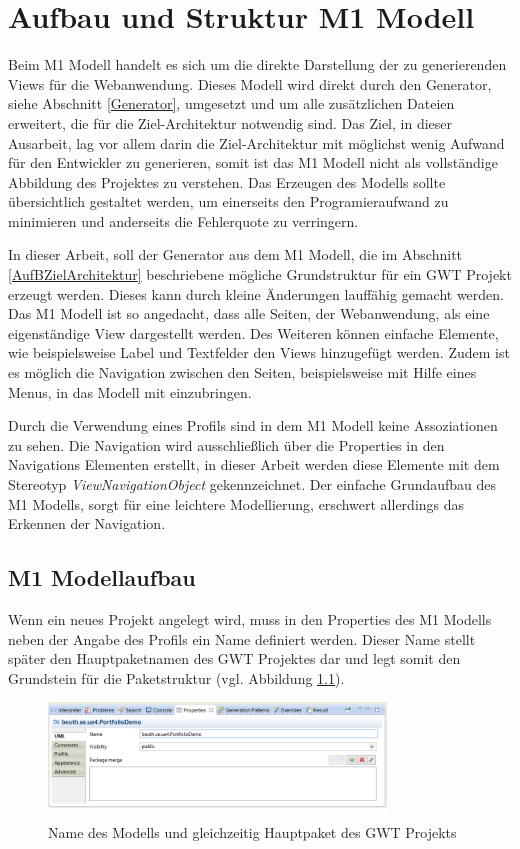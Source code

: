 \chapter{Aufbau und Struktur M1 Modell} \label{M1Modell}
Beim M1 Modell handelt es sich um die direkte Darstellung der zu generierenden
Views für die Webanwendung. Dieses Modell wird direkt durch den Generator,
siehe Abschnitt \ref{Generator}, umgesetzt und um alle zusätzlichen Dateien
erweitert, die für die Ziel-Architektur notwendig sind. Das Ziel, in dieser
Ausarbeit, lag vor allem darin die Ziel-Architektur mit möglichst wenig Aufwand
für den Entwickler zu generieren, somit ist das M1 Modell nicht als vollständige
Abbildung des Projektes zu verstehen. Das Erzeugen des Modells sollte
übersichtlich gestaltet werden, um einerseits den Programieraufwand zu
minimieren und anderseits die Fehlerquote zu verringern.

In dieser Arbeit, soll der Generator aus dem M1 Modell, die im Abschnitt
\ref{AufBZielArchitektur} beschriebene mögliche Grundstruktur für ein GWT
Projekt erzeugt werden. Dieses kann durch kleine Änderungen lauffähig gemacht
werden. Das M1 Modell ist so angedacht, dass alle Seiten, der Webanwendung, als
eine eigenständige View dargestellt werden. Des Weiteren können
einfache Elemente, wie beispielsweise Label und Textfelder den Views hinzugefügt
werden. Zudem ist es möglich die Navigation zwischen den Seiten, beispielsweise
mit Hilfe eines Menus, in das Modell mit einzubringen. 

Durch die Verwendung eines Profils sind in dem M1 Modell keine Assoziationen
zu sehen. Die Navigation wird ausschließlich über die Properties in den
Navigations Elementen erstellt, in dieser Arbeit werden diese Elemente mit dem
Stereotyp \textit{ViewNavigationObject} gekennzeichnet. Der einfache
Grundaufbau des M1 Modells, sorgt für eine leichtere Modellierung, erschwert
allerdings das Erkennen der Navigation.

\section{M1 Modellaufbau}
Wenn ein neues Projekt angelegt wird, muss in den Properties des M1 Modells
neben der Angabe des Profils ein Name definiert werden. Dieser Name stellt
später den Hauptpaketnamen des GWT Projektes dar und legt somit den Grundstein
für die Paketstruktur (vgl. Abbildung \ref{Fig:mainpackage}).

\begin{figure}[htbp]
\begin{center}
\includegraphics[width=0.8\textwidth]{./img/ProjectPackage.png}
\caption{Name des Modells und gleichzeitig Hauptpaket des
GWT Projekts}\label{Fig:mainpackage}
\end{center}
\end{figure}

